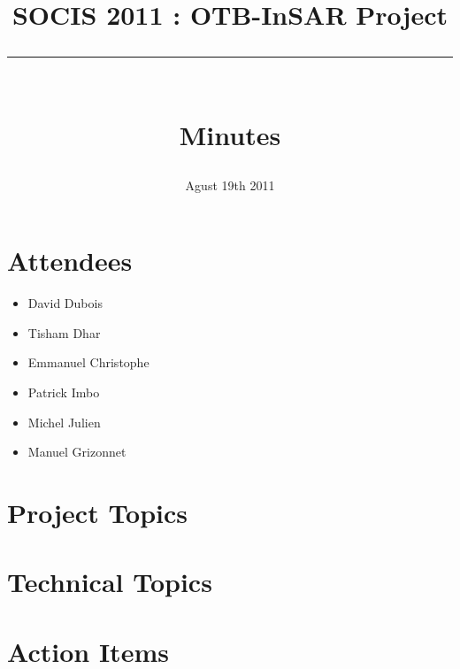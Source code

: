 \documentclass[a4paper,10pt,twoside]{article}
\title{SOCIS 2011 : OTB-InSAR Project \\ 
        {\rule{15cm}{0.5mm}}\\ 
	Minutes }
\date{Agust 19th 2011}
\begin{document}
\maketitle
\tableofcontents 

\section{Attendees}
\begin{itemize}
\item David Dubois
\item Tisham Dhar
\item Emmanuel Christophe
\item Patrick Imbo
\item Michel Julien
\item Manuel Grizonnet
\end{itemize}

\section{Project Topics}

\section{Technical Topics}

\section{Action Items}
\end{document}
